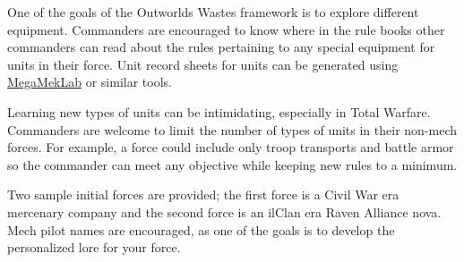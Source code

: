 \documentclass{article}
\begin{document}
One of the goals of the Outworlds Wastes framework is to explore different equipment.
Commanders are encouraged to know where in the rule books other commanders can read about the rules pertaining to any special equipment for units in their force.
Unit record sheets for units can be generated using \href{https://megamek.org}{MegaMekLab} or similar tools.

Learning new types of units can be intimidating, especially in Total Warfare.
Commanders are welcome to limit the number of types of units in their non-mech forces.
For example, a force could include only troop transports and battle armor so the commander can meet any objective while keeping new rules to a minimum.

\newpage

Two sample initial forces are provided; the first force is a Civil War era mercenary company and the second force is an ilClan era Raven Alliance nova.
Mech pilot names are encouraged, as one of the goals is to develop the personalized lore for your force.
\end{document}
